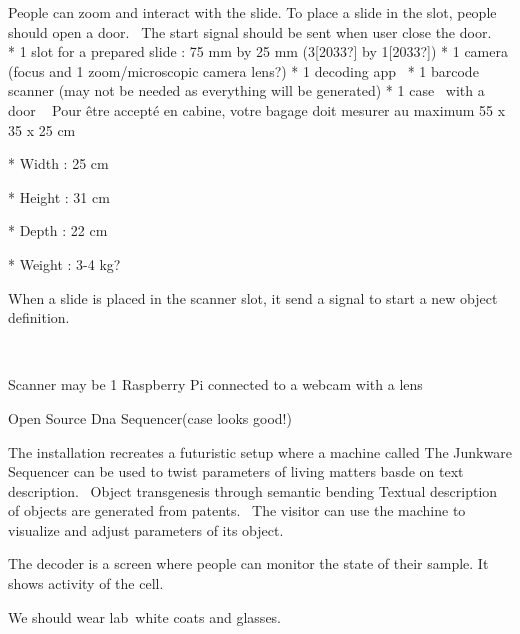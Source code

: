 \bigskip

People can zoom and interact with the slide.
To place a slide in the slot, people should open a door.~
The start signal should be sent when user close the door.
~
* 1 slot for a prepared slide : 75 mm by 25 mm (3[2033?] by 1[2033?])
* 1 camera (focus and 1 zoom/microscopic camera lens?)
* 1 decoding app~
* 1 barcode scanner (may not be needed as everything will be generated)
* 1 case~ with a door
~
Pour \^etre accept\'e en cabine, votre bagage doit mesurer au maximum 55
x 35 x 25 cm~

* Width : 25 cm

* Height : 31 cm

* Depth : 22 cm

* Weight : 3-4 kg?


\bigskip

When a slide is placed in the scanner slot, it send a signal to start a
new object definition.

~

Scanner may be 1 Raspberry Pi connected to a webcam with a lens

Open Source Dna Sequencer(case looks good!)
~

The installation recreates a futuristic setup where a machine called
{\textquotesingle}The Junkware Sequencer{\textquotesingle} can be used
to twist parameters of living matters basde on text description.~
Object transgenesis through semantic bending
Textual description of objects are generated from patents.~
The visitor can use the machine to visualize and adjust parameters of
its object.

\bigskip

The decoder is a screen where people can monitor the state of their
sample.
It shows activity of the cell.

\bigskip

We should wear lab~white coats and glasses.


\bigskip



\bigskip


\bigskip

\bigskip



